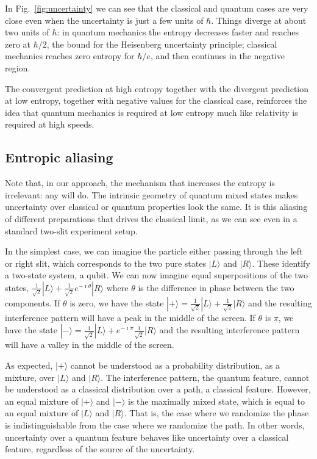 \documentclass{article}
\def\>{\rangle}
\begin{document}
In Fig.~\ref{fig:uncertainty} we can see that the classical and quantum cases are very close even when the uncertainty is just a few units of $\hbar$. Things diverge at about two units of $\hbar$: in quantum mechanics the entropy decreases faster and reaches zero at $\hbar/2$, the bound for the Heisenberg uncertainty principle; classical mechanics reaches zero entropy for $\hbar/e$, and then continues in the negative region.

The convergent prediction at high entropy together with the divergent prediction at low entropy, together with negative values for the classical case, reinforces the idea that quantum mechanics is required at low entropy much like relativity is required at high speeds.

\subsection{Entropic aliasing}

Note that, in our approach, the mechanism that increases the entropy is irrelevant: any will do. The intrinsic geometry of quantum mixed states makes uncertainty over classical or quantum properties look the same. It is this aliasing of different preparations that drives the classical limit, as we can see even in a standard two-slit experiment setup. 

In the simplest case, we can imagine the particle either passing through the left or right slit, which corresponds to the two pure states $|L\>$ and $|R\>$. These identify a two-state system, a qubit. We can now imagine equal superpositions of the two states, $\frac{1}{\sqrt{2}}|L\> + \frac{1}{\sqrt{2}} e^{-\imath \theta} |R\>$ where $\theta$ is the difference in phase between the two components. If $\theta$ is zero, we have the state $|+\> = \frac{1}{\sqrt{2}}|L\> + \frac{1}{\sqrt{2}} |R\>$ and the resulting interference pattern will have a peak in the middle of the screen. If $\theta$ is $\pi$, we have the state $|-\> = \frac{1}{\sqrt{2}}|L\> + e^{-\imath \pi}\frac{1}{\sqrt{2}} |R\>$ and the resulting interference pattern will have a valley in the middle of the screen.

As expected, $|+\>$ cannot be understood as a probability distribution, as a mixture, over $|L\>$ and $|R\>$. The interference pattern, the quantum feature, cannot be understood as a classical distribution over a path, a classical feature. However, an equal mixture of $|+\>$ and $|-\>$ is the maximally mixed state, which is equal to an equal mixture of $|L\>$ and $|R\>$. That is, the case where we randomize the phase is indistinguishable from the case where we randomize the path. In other words, uncertainty over a quantum feature behaves like uncertainty over a classical feature, regardless of the source of the uncertainty.
\end{document}
